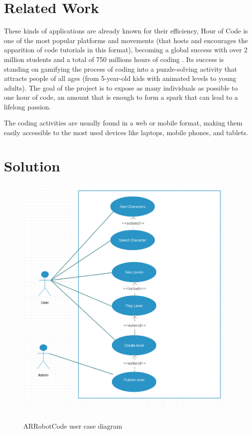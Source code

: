 \documentclass[12 pct]{report}
\begin{document}
\section{Related Work}
These kinds of applications are already known for their efficiency, Hour of Code \cite{wilson2014hour} is one of the most popular platforms and movements (that hosts and encourages the apparition of code tutorials in this format), becoming a global success with over 2 million students and a total of 750 millions hours of coding \cite{codeorg} . Its success is standing on gamifying the process of coding into a puzzle-solving activity that attracts people of all ages (from 5-year-old kids with animated levels to young adults). The goal of the project is to expose as many individuals as possible to one hour of code, an amount that is enough to form a spark that can lead to a lifelong passion.

The coding activities are usually found in a web or mobile format, making them easily accessible to the most used devices like laptops, mobile phones, and tablets.

\section{Solution}

\begin{figure}[H]
\includegraphics[width=1\textwidth]{arrobotdiagram}
\centering
\label{fig:arrobotdiagram}
\caption{ARRobotCode user case diagram}
\end{figure}
\end{document}
